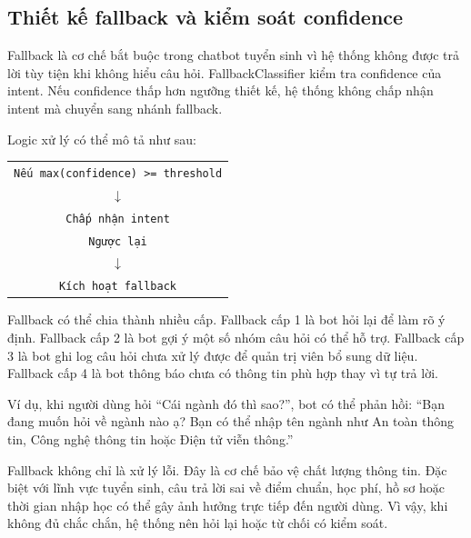 \subsection{Thiết kế fallback và kiểm soát confidence}

Fallback là cơ chế bắt buộc trong chatbot tuyển sinh vì hệ thống không được trả lời tùy tiện khi không hiểu câu hỏi. FallbackClassifier kiểm tra confidence của intent. Nếu confidence thấp hơn ngưỡng thiết kế, hệ thống không chấp nhận intent mà chuyển sang nhánh fallback.

Logic xử lý có thể mô tả như sau:

\begin{center}
\begin{tabular}{c}
\texttt{Nếu max(confidence) >= threshold} \\
$\downarrow$ \\
\texttt{Chấp nhận intent} \\
\texttt{Ngược lại} \\
$\downarrow$ \\
\texttt{Kích hoạt fallback}
\end{tabular}
\end{center}

Fallback có thể chia thành nhiều cấp. Fallback cấp 1 là bot hỏi lại để làm rõ ý định. Fallback cấp 2 là bot gợi ý một số nhóm câu hỏi có thể hỗ trợ. Fallback cấp 3 là bot ghi log câu hỏi chưa xử lý được để quản trị viên bổ sung dữ liệu. Fallback cấp 4 là bot thông báo chưa có thông tin phù hợp thay vì tự trả lời.

Ví dụ, khi người dùng hỏi ``Cái ngành đó thì sao?'', bot có thể phản hồi: ``Bạn đang muốn hỏi về ngành nào ạ? Bạn có thể nhập tên ngành như An toàn thông tin, Công nghệ thông tin hoặc Điện tử viễn thông.''

Fallback không chỉ là xử lý lỗi. Đây là cơ chế bảo vệ chất lượng thông tin. Đặc biệt với lĩnh vực tuyển sinh, câu trả lời sai về điểm chuẩn, học phí, hồ sơ hoặc thời gian nhập học có thể gây ảnh hưởng trực tiếp đến người dùng. Vì vậy, khi không đủ chắc chắn, hệ thống nên hỏi lại hoặc từ chối có kiểm soát.
